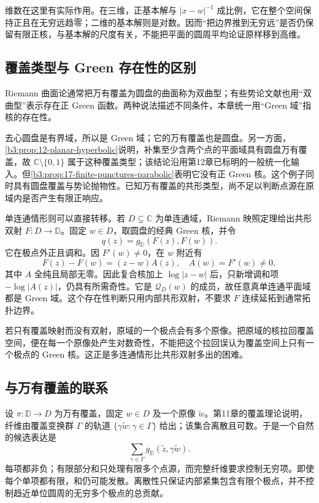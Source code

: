 \ProseParagraphBreak
维数在这里有实际作用。在三维，正基本解与 \(|x-w|^{-1}\) 成比例，它在整个空间保持正且在无穷远趋零；二维的基本解则是对数。因而“把边界推到无穷远”是否仍保留有限正核，与基本解的尺度有关，不能把平面的圆周平均论证原样移到高维。

\subsection{覆盖类型与 Green 存在性的区别}
\label{b3:subsec:170204}

Riemann 曲面论通常把万有覆盖为圆盘的曲面称为双曲型；有些势论文献也用“双曲型”表示存在正 Green 函数。两种说法描述不同条件，本章统一用“Green 域”指核的存在性。

\ProseParagraphBreak
去心圆盘是有界域，所以是 Green 域；它的万有覆盖也是圆盘。另一方面，\cref{b3:prop:12-planar-hyperbolic}说明，补集至少含两个点的平面域具有圆盘万有覆盖，故 \(\mathbb C\setminus\{0,1\}\) 属于这种覆盖类型；该结论沿用第12章已标明的一般统一化输入。但\cref{b3:prop:17-finite-punctures-parabolic}表明它没有正 Green 核。这个例子同时具有圆盘覆盖与势论抛物性。已知万有覆盖的共形类型，尚不足以判断点源在原域内是否产生有限正响应。

\ProseParagraphBreak
单连通情形则可以直接转移。若 \(D\subsetneq\mathbb C\) 为单连通域，Riemann 映照定理给出共形双射 \(F:D\to\mathbb D\)。固定 \(w\in D\)，取圆盘的经典 Green 核，并令
\[
 q(z)=g_{\mathbb D}(F(z),F(w)).
\]
它在极点外正且调和。因 \(F'(w)\ne0\)，在 \(w\) 附近有
\[
 F(z)-F(w)=(z-w)A(z),\quad A(w)=F'(w)\ne0,
\]
其中 \(A\) 全纯且局部无零。因此复合核加上 \(\log|z-w|\) 后，只新增调和项 \(-\log|A(z)|\)，仍具有所需奇性。它是 \(\mathcal Q_D(w)\) 的成员，故任意真单连通平面域都是 Green 域。这个存在性判断只用内部共形双射，不要求 \(F\) 连续延拓到通常拓扑边界。

\ProseParagraphBreak
若只有覆盖映射而没有双射，原域的一个极点会有多个原像。把原域的核拉回覆盖空间，便在每一个原像处产生对数奇性，不能把这个拉回误认为覆盖空间上只有一个极点的 Green 核。这正是多连通情形比共形双射多出的困难。

\subsection{与万有覆盖的联系}
\label{b3:subsec:170205}

设 \(\pi:\mathbb D\to D\) 为万有覆盖，固定 \(w\in D\) 及一个原像 \(\widetilde w\)。第11章的覆盖理论说明，纤维由覆盖变换群 \(\Gamma\) 的轨道 \(\{\gamma\widetilde w:\gamma\in\Gamma\}\) 给出；该集合离散且可数。于是一个自然的候选表达是
\[
 \sum_{\gamma\in\Gamma}
 g_{\mathbb D}(\widetilde z,\gamma\widetilde w).
\]
每项都非负；有限部分和只处理有限多个点源，而完整纤维要求控制无穷项。即使每个单项都有限，和仍可能发散。离散性只保证内部紧集包含有限个极点，并不控制趋近单位圆周的无穷多个极点的总贡献。

